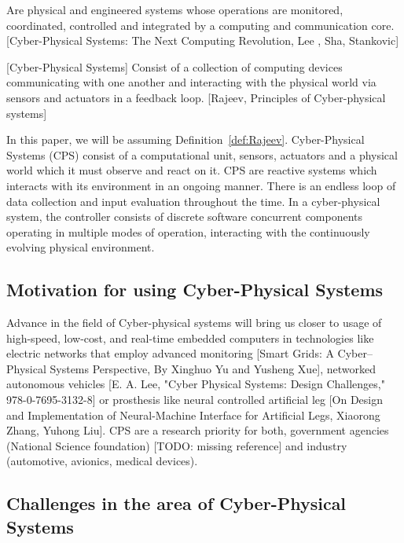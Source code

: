 \documentclass[english,technical,10pt]{FITreport}[2018/01/26]
\begin{document}
\begin{definition}
    Are physical and engineered systems whose operations are monitored, coordinated, controlled and integrated by a computing and communication core.[Cyber-Physical Systems: The Next Computing Revolution, Lee , Sha, Stankovic]

\end{definition}

\begin{definition}\label{def:Rajeev}[Cyber-Physical Systems]
    Consist of a collection of computing devices communicating with one another and interacting with the physical world via sensors and actuators in a feedback loop. [Rajeev, Principles of Cyber-physical systems]
\end{definition}

In this paper, we will be assuming Definition~\ref{def:Rajeev}. Cyber-Physical Systems (CPS) consist of a computational unit, sensors, actuators and a physical world which it must observe and react on it. CPS are reactive systems which interacts with its environment in an ongoing manner. There is an endless loop of data collection and input evaluation throughout the time. In a cyber-physical system, the controller consists of discrete software concurrent components operating in multiple modes of operation, interacting with the continuously evolving physical environment.

\subsection{Motivation for using Cyber-Physical Systems}

Advance in the field of Cyber-physical systems will bring us closer to usage of high-speed, low-cost, and real-time embedded computers in technologies like electric networks that employ advanced monitoring [Smart Grids: A Cyber–Physical Systems Perspective, By Xinghuo Yu and Yusheng Xue], networked autonomous vehicles [E. A. Lee, "Cyber Physical Systems: Design Challenges," 978-0-7695-3132-8] or prosthesis like neural controlled artificial leg [On Design and Implementation of Neural-Machine Interface for Artificial Legs, Xiaorong Zhang, Yuhong Liu]. CPS are a research priority for both, government agencies (National Science foundation) [TODO: missing reference] and industry (automotive, avionics, medical devices).

\subsection{Challenges in the area of Cyber-Physical Systems}
\end{document}
